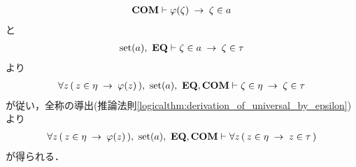 \begin{sketch}
\begin{description}
\begin{itemize}
\begin{align}
							\mbox{\bf COM} \vdash \varphi(\zeta) \hspace{0.25em}\rightarrow\hspace{0.25em} \zeta \in a
						\end{align}
						と
						\begin{align}
							\operatorname*{set} (a),\ \mbox{{\bf EQ}} \vdash \zeta \in a \hspace{0.25em}\rightarrow\hspace{0.25em} \zeta \in \tau
						\end{align}
						より
						\begin{align}
							\forall z\, (\, z \in \eta \rarrow \varphi(z)\, ),\ 
							\set{a},\ \EQAX,\COMAX
							\vdash \zeta \in \eta \rarrow \zeta \in \tau
						\end{align}
						が従い，全称の導出(推論法則\ref{logicalthm:derivation_of_universal_by_epsilon})より
						\begin{align}
							\forall z\, (\, z \in \eta \rarrow \varphi(z)\, ),\ 
							\set{a},\ \EQAX,\COMAX \vdash 
							\forall z\, (\, z \in \eta \rarrow z \in \tau\, )
						\end{align}
						が得られる．
					

\end{itemize}
\end{description}
\end{sketch}
